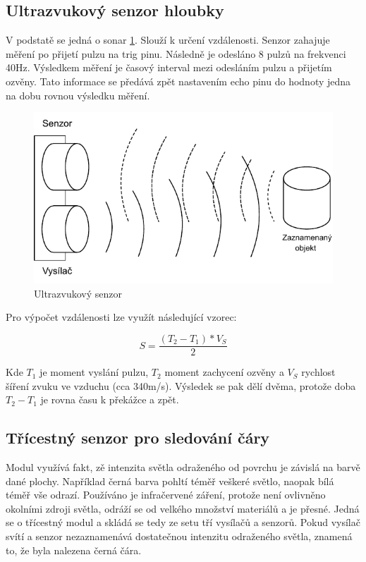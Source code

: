 \subsection*{Ultrazvukový senzor hloubky} \label{theory:ultrasonic}
V podstatě se jedná o sonar \ref{fig:ultrasonic}. Slouží k určení vzdálenosti. Senzor zahajuje měření po přijetí pulzu na trig pinu. Následně je odesláno 8 pulzů na frekvenci 40Hz. Výsledkem měření je časový interval mezi odesláním pulzu a přijetím ozvěny. Tato informace se předává zpět nastavením echo pinu do hodnoty jedna na dobu rovnou výsledku měření. \cite[str:~93]{embeded_robotics}

\begin{figure}[h!]
	\centering
	\includegraphics[scale=0.75]{obrazky-figures/ultrasonic.pdf}
	\caption{Ultrazvukový senzor}
	\label{fig:ultrasonic}
\end{figure}

Pro výpočet vzdálenosti lze využít následující vzorec:

\begin{equation}
	S = \frac{(T_2 - T_1) * V_S}{2}
\end{equation}

Kde $T_1$ je moment vyslání pulzu, $T_2$ moment zachycení ozvěny a $V_S$ rychlost šíření zvuku ve vzduchu (cca 340m/s). Výsledek se pak dělí dvěma, protože doba $T_2 - T_1$ je rovna času k překážce a zpět.

\subsection*{Třícestný senzor pro sledování čáry}
Modul využívá fakt, zě intenzita světla odraženého od povrchu je závislá na barvě dané plochy. Například černá barva pohltí téměř veškeré světlo, naopak bílá téměř vše odrazí. Používáno je infračervené záření, protože není ovlivněno okolními zdroji světla, odráží se od velkého množství materiálů a je přesné. Jedná se o třícestný modul a skládá se tedy ze setu tří vysílačů a senzorů. Pokud vysílač svítí a senzor nezaznamenává dostatečnou intenzitu odraženého světla, znamená to, že byla nalezena černá čára. \cite[str:~115, 148]{mobilní_roboty}

